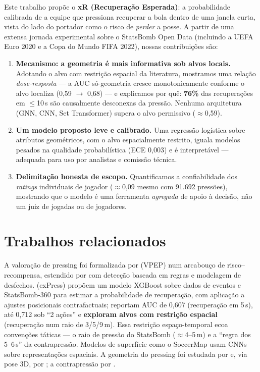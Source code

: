 \documentclass[a4paper,11pt]{article}
\begin{document}
Este trabalho propõe o \textbf{xR (Recuperação Esperada)}: a probabilidade calibrada de a equipe que pressiona recuperar a bola dentro de uma janela curta, vista do lado do portador como o risco de \emph{perder} a posse. A partir de uma extensa jornada experimental sobre o StatsBomb Open Data (incluindo a UEFA Euro 2020 e a Copa do Mundo FIFA 2022), nossas contribuições são:

\begin{enumerate}
\item \textbf{Mecanismo: a geometria é mais informativa sob alvos locais.} Adotando o alvo com restrição espacial da literatura, mostramos uma relação \emph{dose-resposta} --- a AUC só-geometria cresce monotonicamente conforme o alvo localiza (0,59 $\to$ 0,68) --- e explicamos por quê: \textbf{76\%} das recuperações em $\le$10\,s são causalmente desconexas da pressão. Nenhuma arquitetura (GNN, CNN, Set Transformer) supera o alvo permissivo ($\approx$0,59).
\item \textbf{Um modelo proposto leve e calibrado.} Uma regressão logística sobre atributos geométricos, com o alvo espacialmente restrito, iguala modelos pesados na qualidade probabilística (ECE 0,003) e é interpretável --- adequada para uso por analistas e comissão técnica.
\item \textbf{Delimitação honesta de escopo.} Quantificamos a confiabilidade dos \emph{ratings} individuais de jogador ($\approx$0,09 mesmo com 91.692 pressões), mostrando que o modelo é uma ferramenta \emph{agregada} de apoio à decisão, não um juiz de jogadas ou de jogadores.
\end{enumerate}

\section{Trabalhos relacionados}

A valoração de pressing foi formalizada por \citet{robberechts2019} (VPEP) num arcabouço de risco--recompensa, estendido por \citet{merckx2021} com detecção baseada em regras e modelagem de desfechos. \citet{lee2025express} (exPress) propõem um modelo XGBoost sobre dados de eventos e StatsBomb-360 para estimar a probabilidade de recuperação, com aplicação a ajustes posicionais contrafactuais; reportam AUC de 0,607 (recuperação em 5\,s), até 0,712 sob ``2 ações'' e \textbf{exploram alvos com restrição espacial} (recuperação num raio de 3/5/9\,m). Essa restrição espaço-temporal ecoa convenções táticas --- o raio de pressão do StatsBomb ($\approx$4--5\,m) e a ``regra dos 5--6\,s'' da contrapressão. Modelos de superfície como o SoccerMap \citep{fernandez2020soccermap} usam CNNs sobre representações espaciais. A geometria do pressing foi estudada por \citet{andrienko2017} e, via pose 3D, por \citet{gu2024pressure}; a contrapressão por \citet{bauer2021counterpress}.
\end{document}

